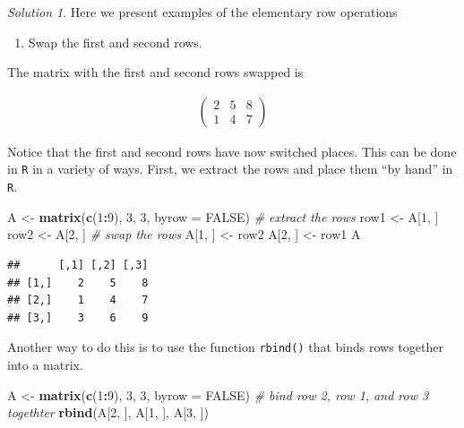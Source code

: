 \documentclass[
]{book}
\newenvironment{Shaded}{\begin{snugshade}}{\end{snugshade}}
\newcommand{\CommentTok}[1]{\textcolor[rgb]{0.56,0.35,0.01}{\textit{#1}}}
\newcommand{\DataTypeTok}[1]{\textcolor[rgb]{0.13,0.29,0.53}{#1}}
\newcommand{\DecValTok}[1]{\textcolor[rgb]{0.00,0.00,0.81}{#1}}
\newcommand{\KeywordTok}[1]{\textcolor[rgb]{0.13,0.29,0.53}{\textbf{#1}}}
\newcommand{\NormalTok}[1]{#1}
\newcommand{\OperatorTok}[1]{\textcolor[rgb]{0.81,0.36,0.00}{\textbf{#1}}}
\newcommand{\OtherTok}[1]{\textcolor[rgb]{0.56,0.35,0.01}{#1}}
\newcommand{\StringTok}[1]{\textcolor[rgb]{0.31,0.60,0.02}{#1}}
\providecommand{\tightlist}{%
  \setlength{\itemsep}{0pt}\setlength{\parskip}{0pt}}
\theoremstyle{definition}
\theoremstyle{definition}
\theoremstyle{definition}
\theoremstyle{definition}
\theoremstyle{remark}
\newtheorem*{solution}{Solution}
\begin{document}
\begin{solution}

Here we present examples of the elementary row operations

\begin{enumerate}
\def\labelenumi{\arabic{enumi})}
\tightlist
\item
  Swap the first and second rows.
\end{enumerate}

The matrix with the first and second rows swapped is

\[
\begin{aligned}
\begin{pmatrix} 2 & 5 & 8 \\ 1 & 4 & 7 \end{pmatrix}
\end{aligned}
\]

Notice that the first and second rows have now switched places. This can be done in \texttt{R} in a variety of ways. First, we extract the rows and place them ``by hand'' in \texttt{R}.

\begin{Shaded}
\begin{Highlighting}[]
\NormalTok{A <-}\StringTok{ }\KeywordTok{matrix}\NormalTok{(}\KeywordTok{c}\NormalTok{(}\DecValTok{1}\OperatorTok{:}\DecValTok{9}\NormalTok{), }\DecValTok{3}\NormalTok{, }\DecValTok{3}\NormalTok{, }\DataTypeTok{byrow =} \OtherTok{FALSE}\NormalTok{)}
\CommentTok{# extract the rows}
\NormalTok{row1 <-}\StringTok{ }\NormalTok{A[}\DecValTok{1}\NormalTok{, ] }
\NormalTok{row2 <-}\StringTok{ }\NormalTok{A[}\DecValTok{2}\NormalTok{, ]}
\CommentTok{# swap the rows}
\NormalTok{A[}\DecValTok{1}\NormalTok{, ] <-}\StringTok{ }\NormalTok{row2}
\NormalTok{A[}\DecValTok{2}\NormalTok{, ] <-}\StringTok{ }\NormalTok{row1}
\NormalTok{A}
\end{Highlighting}
\end{Shaded}

\begin{verbatim}
##      [,1] [,2] [,3]
## [1,]    2    5    8
## [2,]    1    4    7
## [3,]    3    6    9
\end{verbatim}

Another way to do this is to use the function \texttt{rbind()} that binds rows together into a matrix.

\begin{Shaded}
\begin{Highlighting}[]
\NormalTok{A <-}\StringTok{ }\KeywordTok{matrix}\NormalTok{(}\KeywordTok{c}\NormalTok{(}\DecValTok{1}\OperatorTok{:}\DecValTok{9}\NormalTok{), }\DecValTok{3}\NormalTok{, }\DecValTok{3}\NormalTok{, }\DataTypeTok{byrow =} \OtherTok{FALSE}\NormalTok{)}
\CommentTok{# bind row 2, row 1, and row 3 togethter}
\KeywordTok{rbind}\NormalTok{(A[}\DecValTok{2}\NormalTok{, ], A[}\DecValTok{1}\NormalTok{, ], A[}\DecValTok{3}\NormalTok{, ])}
\end{Highlighting}
\end{Shaded}


\end{solution}
\end{document}
